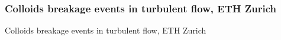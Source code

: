     \begin{frame}[label=app-31]
    \frametitle{Colloids breakage events in turbulent flow, ETH Zurich}
    \end{frame}
    
    
    \begin{frame}[label=app-3]{Colloids breakage events in turbulent flow, ETH Zurich}
    \end{frame}
    
    
    
